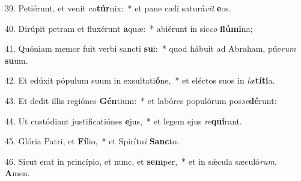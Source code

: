 39. Petiérunt, et venit co\textbf{túr}nix:~*  et pane cæli saturá\textit{vit} \textbf{e}os.\

40. Dirúpit petram et fluxérunt \textbf{a}quæ:~*  abiérunt in sic\textit{co} \textbf{flú}\textbf{mi}na;\

41. Quóniam memor fuit verbi sancti \textbf{su}i:~*  quod hábuit ad Abraham, púe\textit{rum} \textbf{su}um.\

42. Et edúxit pópulum suum in exsultati\textbf{ó}ne,~*  et eléctos suos in \textit{læ}\textbf{tí}\textbf{ti}a.\

43. Et dedit illis regiónes \textbf{Gén}tium:~*  et labóres populórum pos\textit{se}\textbf{dé}runt:\

44. Ut custódiant justificatiónes \textbf{e}jus,~*  et legem ejus \textit{re}\textbf{quí}rant.\

45. Glória Patri, et \textbf{Fí}lio,~*  et Spirítu\textit{i} \textbf{Sanc}to.\

46. Sicut erat in princípio, et nunc, et \textbf{sem}per,~*  et in sǽcula sæculó\textit{rum}. \textbf{A}men.\

